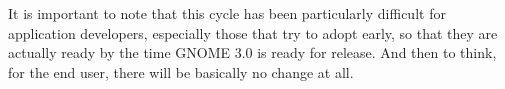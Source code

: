 It is important to note that this cycle has been particularly difficult for application developers, especially those that try to adopt early, 
so that they are actually ready by the time GNOME 3.0 is ready for release.   And then to think, for the end user, there will be basically no 
change at all.

